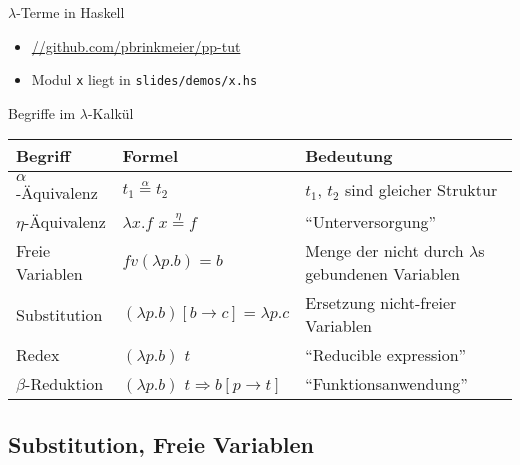 \documentclass{beamer}
\newcommand{\code}[1]{
	\begin{mdframed}
		
	\end{mdframed}
}
\begin{document}
\begin{frame}{$\lambda$-Terme in Haskell}
	\code{demos/Lambda.hs}

	\begin{itemize}
		\item \url{//github.com/pbrinkmeier/pp-tut}
		\item Modul \texttt{x} liegt in \texttt{slides/demos/x.hs}
	\end{itemize}
\end{frame}

\newcommand{\aeq}{\stackrel{\alpha}{=}}
\newcommand{\naeq}{\stackrel{\alpha}{\neq}}
\newcommand{\eeq}{\stackrel{\eta}{=}}


\begin{frame}[label=lambdaoverview]{Begriffe im $\lambda$-Kalkül}
	\fontsize{9pt}{13}\selectfont

	\begin{tabularx}{\textwidth}{ s | X | X }
		\textbf{Begriff} & \textbf{Formel} & \textbf{Bedeutung} \\
		\hline
		$\alpha$-Äquivalenz & $t_1 \aeq t_2$ & $t_1$, $t_2$ sind gleicher Struktur \\
		\hline
		$\eta$-Äquivalenz & $\lambda{}x.f$ $x \eeq f$ & \enquote{Unterversorgung} \\
		\hline
		Freie Variablen & $fv(\lambda{}p.b) = { b }$ & Menge der nicht durch $\lambda$s gebundenen Variablen \\
		\hline
		Substitution & $(\lambda{}p.b)\left[b\rightarrow{}c\right]=\lambda{}p.c$ & Ersetzung nicht-freier Variablen \\
		\hline
		Redex & $(\lambda{}p.b)$ $t$ & \enquote{Reducible expression} \\
		\hline
		$\beta$-Reduktion & $(\lambda{}p.b)$ $t \Rightarrow b\left[p\rightarrow{}t\right]$ & \enquote{Funktionsanwendung} \\
	\end{tabularx}
\end{frame}

\subsection{Substitution, Freie Variablen}
\end{document}
